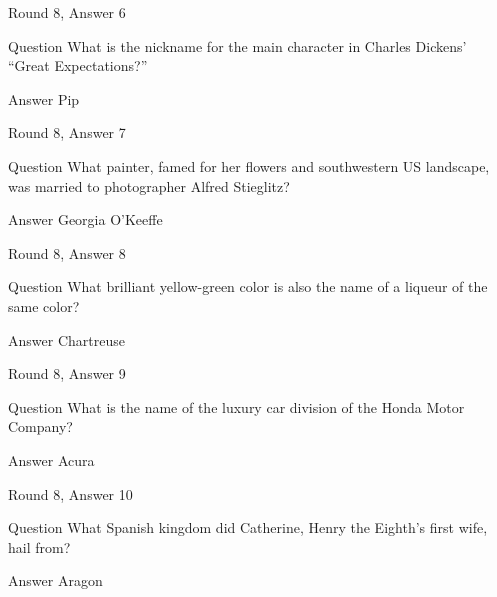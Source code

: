 \documentclass[11pt]{beamer}
\begin{document}
\begin{frame}[t]{Round 8, Answer 6}
\vspace{2em}
\begin{block}{Question}
What is the nickname for the main character in Charles Dickens' ``Great Expectations?''
\end{block}
\pause{}
\begin{block}{Answer}
Pip
\end{block}
\end{frame}
    

\begin{frame}[t]{Round 8, Answer 7}
\vspace{2em}
\begin{block}{Question}
What painter, famed for her flowers and southwestern US landscape, was married to photographer Alfred Stieglitz\@?
\end{block}
\pause{}
\begin{block}{Answer}
Georgia O'Keeffe
\end{block}
\end{frame}
    

\begin{frame}[t]{Round 8, Answer 8}
\vspace{2em}
\begin{block}{Question}
What brilliant yellow-green color is also the name of a liqueur of the same color\@?
\end{block}
\pause{}
\begin{block}{Answer}
Chartreuse
\end{block}
\end{frame}
    

\begin{frame}[t]{Round 8, Answer 9}
\vspace{2em}
\begin{block}{Question}
What is the name of the luxury car division of the Honda Motor Company\@?
\end{block}
\pause{}
\begin{block}{Answer}
Acura
\end{block}
\end{frame}
    

\begin{frame}[t]{Round 8, Answer 10}
\vspace{2em}
\begin{block}{Question}
What Spanish kingdom did Catherine, Henry the Eighth's first wife, hail from\@?
\end{block}
\pause{}
\begin{block}{Answer}
Aragon
\end{block}
\end{frame}
    
\end{document}
